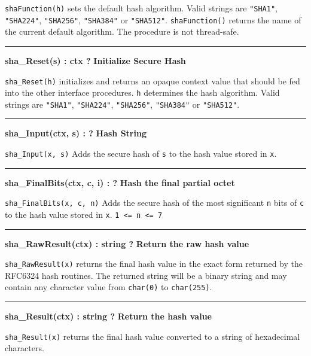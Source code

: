 \noindent
{}
\texttt{shaFunction(h)} sets the default hash algorithm.  Valid strings are
\texttt{"SHA1"}, \texttt{"SHA224"}, \texttt{"SHA256"}, \texttt{"SHA384"} or
\texttt{"SHA512"}.  \texttt{shaFunction()} returns the name of the current
default algorithm.  The procedure is not thread-safe. \WarningNotThreadSafe

\bigskip\hrule\vspace{0.1cm}
\noindent
{\bf sha\_Reset(s) : ctx ? } \hfill {\bf Initialize Secure Hash}

\noindent
{}
\texttt{sha\_Reset(h)} initializes and returns an opaque context value that
should be fed into the other interface procedures. \texttt{h} determines the
hash algorithm. Valid strings are \texttt{"SHA1"}, \texttt{"SHA224"},
\texttt{"SHA256"}, \texttt{"SHA384"} or \texttt{"SHA512"}.

\bigskip\hrule\vspace{0.1cm}
\noindent
{\bf sha\_Input(ctx, s) : ? } \hfill {\bf Hash String}

\noindent
{}
\texttt{sha\_Input(x, s)} Adds the secure hash of \texttt{s} to the hash value
stored in \texttt{x}.

\bigskip\hrule\vspace{0.1cm}
\noindent
{\bf sha\_FinalBits(ctx, c, i) : ? } \hfill {\bf Hash the final partial octet}

\noindent
{}
\texttt{sha\_FinalBits(x, c, n)} Adds the secure hash of the most significant
\texttt{n} bits of \texttt{c} to the hash value stored in \texttt{x}.
\verb|1 <= n <= 7|

\bigskip\hrule\vspace{0.1cm}
\noindent
{\bf sha\_RawResult(ctx) : string ? } \hfill {\bf Return the raw hash value}

\noindent
{}
\texttt{sha\_RawResult(x)} returns the final hash value in the exact form
returned by the RFC6324 hash routines. The returned string will be a binary
string and may contain any character value from \texttt{char(0)} to
\texttt{char(255)}.

\bigskip\hrule\vspace{0.1cm}
\noindent
{\bf sha\_Result(ctx) : string ? } \hfill {\bf Return the hash value}

\noindent
{}
\texttt{sha\_Result(x)} returns the final hash value converted to a string of
hexadecimal characters.


